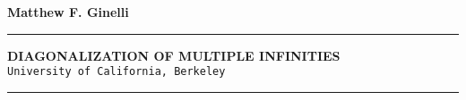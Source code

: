 \documentclass[a4paper,12pt]{article}
\newcommand{\titleline}[1]{\noindent\rule{\textwidth}{#1}}
\begin{document}
\vspace*{\fill}

\begin{center}

\textbf{Matthew F. Ginelli}

\end{center}
\titleline{5pt}

\begin{center}
\bigskip
\textbf{DIAGONALIZATION OF MULTIPLE INFINITIES}\\
\smallskip
\texttt{University of California, Berkeley}
\medskip
\end{center}

\titleline{5pt}
\vspace*{\fill}
\end{document}
